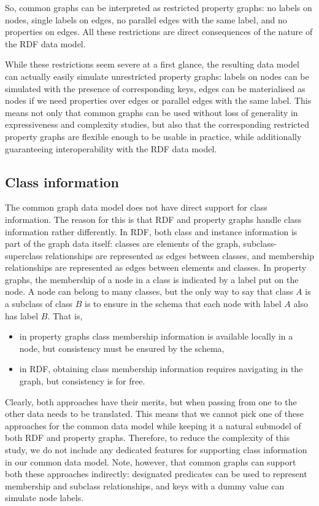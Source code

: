 So, common graphs can be interpreted as restricted property graphs: no labels on nodes, single labels on edges, no parallel edges with the same label, and no properties on edges. All these restrictions are direct consequences of the nature of the RDF data model. 

While these restrictions seem severe at a first glance, the resulting data model can actually easily simulate unrestricted property graphs: labels on nodes can be simulated with the presence of corresponding keys, edges can be materialised as nodes if we need properties over edges or parallel edges with the same label. This means not only that common graphs can be used without loss of generality in expressiveness and complexity studies, but also that the corresponding restricted property graphs are flexible enough to be usable in practice, while additionally guaranteeing interoperability with the RDF data model. 

\subsection{Class information}
The common graph data model does not have direct support for class information. The reason for this is that RDF and property graphs handle class information rather differently. In RDF, both class and instance information is part of the graph data itself:  classes are elements of the graph, subclass-superclass relationships are represented as edges between classes, and membership relationships are represented as edges between elements and classes. In property graphs, the membership of a node in a class is indicated by a label put on the node. A node can belong to many classes, but the only way to say that class $A$ is a subclass of class $B$ is to ensure in the schema that each node with label $A$ also has label $B$. That is, 
\begin{itemize}
\item in property graphs class membership information is available locally in a node, but consistency must be ensured by the schema, 
\item in RDF, obtaining class membership information requires navigating in the graph, but consistency is for free.
\end{itemize}
Clearly, both approaches have their merits, but when passing from one to the other data needs to be translated. This means that we cannot pick one of these approaches for the common data model while keeping it a natural submodel of both RDF and property graphs. Therefore, to reduce the complexity of this study, we do not include any dedicated features for supporting class information in our common data model. 
Note, however, that common graphs can support both these approaches indirectly: designated predicates can be used to represent membership and subclass relationships, and keys with a dummy value can simulate node labels. 
